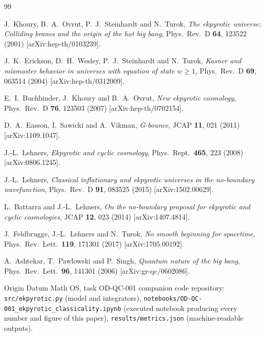 \documentclass[11pt,a4paper]{article}
\begin{document}
\begin{thebibliography}{99}

  J.~Khoury, B.~A.~Ovrut, P.~J.~Steinhardt and N.~Turok,
  \emph{The ekpyrotic universe: Colliding branes and the origin of the hot
  big bang}, Phys.\ Rev.\ D \textbf{64}, 123522 (2001)
  [arXiv:hep-th/0103239].

  J.~K.~Erickson, D.~H.~Wesley, P.~J.~Steinhardt and N.~Turok,
  \emph{Kasner and mixmaster behavior in universes with equation of state
  $w\ge1$}, Phys.\ Rev.\ D \textbf{69}, 063514 (2004)
  [arXiv:hep-th/0312009].

  E.~I.~Buchbinder, J.~Khoury and B.~A.~Ovrut,
  \emph{New ekpyrotic cosmology}, Phys.\ Rev.\ D \textbf{76}, 123503
  (2007) [arXiv:hep-th/0702154].

  D.~A.~Easson, I.~Sawicki and A.~Vikman,
  \emph{G-bounce}, JCAP \textbf{11}, 021 (2011) [arXiv:1109.1047].

  J.-L.~Lehners,
  \emph{Ekpyrotic and cyclic cosmology}, Phys.\ Rept.\ \textbf{465}, 223
  (2008) [arXiv:0806.1245].

  J.-L.~Lehners,
  \emph{Classical inflationary and ekpyrotic universes in the no-boundary
  wavefunction}, Phys.\ Rev.\ D \textbf{91}, 083525 (2015)
  [arXiv:1502.00629].

  L.~Battarra and J.-L.~Lehners,
  \emph{On the no-boundary proposal for ekpyrotic and cyclic cosmologies},
  JCAP \textbf{12}, 023 (2014) [arXiv:1407.4814].

  J.~Feldbrugge, J.-L.~Lehners and N.~Turok,
  \emph{No smooth beginning for spacetime}, Phys.\ Rev.\ Lett.\
  \textbf{119}, 171301 (2017) [arXiv:1705.00192].

  A.~Ashtekar, T.~Pawlowski and P.~Singh,
  \emph{Quantum nature of the big bang}, Phys.\ Rev.\ Lett.\ \textbf{96},
  141301 (2006) [arXiv:gr-qc/0602086].

  Origin Datum Math OS, task OD-QC-001 companion code repository:
  \texttt{src/ekpyrotic.py} (model and integrators),
  \texttt{notebooks/OD-QC-001\_ekpyrotic\_classicality.ipynb} (executed
  notebook producing every number and figure of this paper),
  \texttt{results/metrics.json} (machine-readable outputs).

\end{thebibliography}
\end{document}
